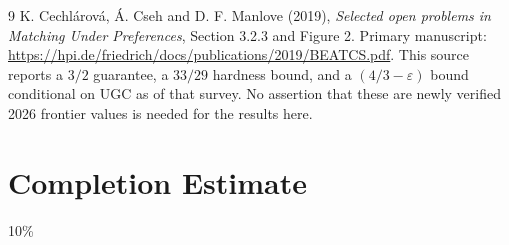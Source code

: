 \documentclass[11pt,a4paper]{article}
\theoremstyle{remark}
\begin{document}
\begin{thebibliography}{9}
 K. Cechl\'arov\'a, \'A. Cseh and D. F. Manlove (2019), \emph{Selected open problems in Matching Under Preferences}, Section 3.2.3 and Figure 2. Primary manuscript: \url{https://hpi.de/friedrich/docs/publications/2019/BEATCS.pdf}. This source reports a $3/2$ guarantee, a $33/29$ hardness bound, and a $(4/3-\varepsilon)$ bound conditional on UGC as of that survey. No assertion that these are newly verified 2026 frontier values is needed for the results here.
\end{thebibliography}

\section{Completion Estimate}
10\%
\end{document}
